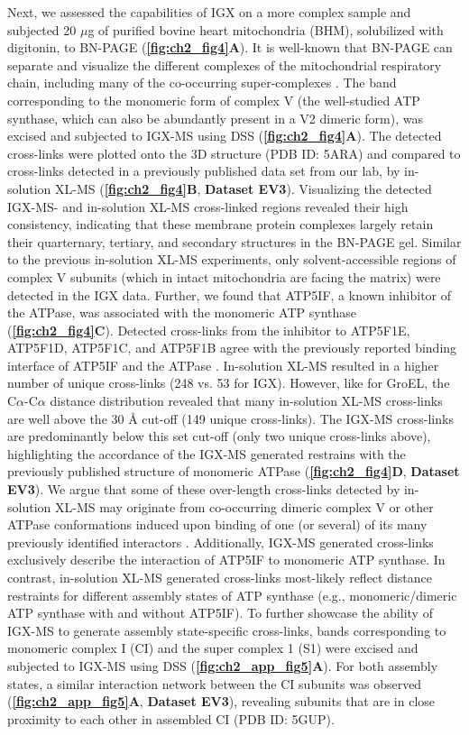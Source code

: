 Next, we assessed the capabilities of IGX on a more complex sample and subjected 20 $\mu$g of purified bovine heart mitochondria (BHM), solubilized with digitonin, to BN-PAGE (\textbf{\autoref{fig:ch2_fig4}A}). It is well-known that BN-PAGE can separate and visualize the different complexes of the mitochondrial respiratory chain, including many of the co-occurring super-complexes \cite{Schagger_2000}. The band corresponding to the monomeric form of complex V (the well-studied ATP synthase, which can also be abundantly present in a V2 dimeric form), was excised and subjected to IGX-MS using DSS (\textbf{\autoref{fig:ch2_fig4}A}). The detected cross-links were plotted onto the 3D structure (PDB ID: 5ARA) and compared to cross-links detected in a previously published data set from our lab, by in-solution XL-MS \cite{Liu_2018} (\textbf{\autoref{fig:ch2_fig4}B}, \textbf{Dataset EV3}). Visualizing the detected IGX-MS- and in-solution XL-MS cross-linked regions revealed their high consistency, indicating that these membrane protein complexes largely retain their quarternary, tertiary, and secondary structures in the BN-PAGE gel. Similar to the previous in-solution XL-MS experiments, only solvent-accessible regions of complex V subunits (which in intact mitochondria are facing the matrix) were detected in the IGX data. Further, we found that ATP5IF, a known inhibitor of the ATPase, was associated with the monomeric ATP synthase (\textbf{\autoref{fig:ch2_fig4}C}). Detected cross-links from the inhibitor to ATP5F1E, ATP5F1D, ATP5F1C, and ATP5F1B agree with the previously reported binding interface of ATP5IF and the ATPase \cite{Gledhill_2007}. In-solution XL-MS resulted in a higher number of unique cross-links (248 vs. 53 for IGX). However, like for GroEL, the C$\alpha$-C$\alpha$ distance distribution revealed that many in-solution XL-MS cross-links are well above the 30 Å cut-off (149 unique cross-links). The IGX-MS cross-links are predominantly below this set cut-off (only two unique cross-links above), highlighting the accordance of the IGX-MS generated restrains with the previously published structure of monomeric ATPase (\textbf{\autoref{fig:ch2_fig4}D}, \textbf{Dataset EV3}). We argue that some of these over-length cross-links detected by in-solution XL-MS may originate from co-occurring dimeric complex V or other ATPase conformations induced upon binding of one (or several) of its many previously identified interactors \cite{Liu_2018, Ryl_2020, Schweppe_2017}. Additionally, IGX-MS generated cross-links exclusively describe the interaction of ATP5IF to monomeric ATP synthase. In contrast, in-solution XL-MS generated cross-links most-likely reflect distance restraints for different assembly states of ATP synthase (e.g., monomeric/dimeric ATP synthase with and without ATP5IF). To further showcase the ability of IGX-MS to generate assembly state-specific cross-links, bands corresponding to monomeric complex I (CI) and the super complex 1 (S1) were excised and subjected to IGX-MS using DSS (\textbf{\autoref{fig:ch2_app_fig5}A}). For both assembly states, a similar interaction network between the CI subunits was observed (\textbf{\autoref{fig:ch2_app_fig5}A}, \textbf{Dataset EV3}), revealing subunits that are in close proximity to each other in assembled CI (PDB ID: 5GUP). 